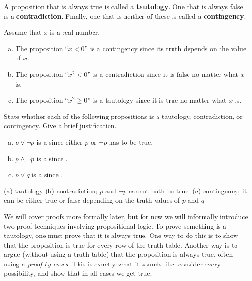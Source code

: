 \begin{df}
A proposition that is always true is called a {\bf tautology}.  
One that is always false is a {\bf contradiction}.  
Finally, one that is neither of these is called  a {\bf contingency}.
\end{df}

\begin{exa}
Assume that $x$ is a real number.
\begin{enumerate}[(a)]
\item
The proposition ``$x<0$'' is a contingency since its truth depends on the value of $x$.
\item
The proposition ``$x^2<0$'' is a contradiction since it is false no matter what $x$ is.
\item
The proposition ``$x^2\geq 0$'' is a tautology since it is true no matter what $x$ is.
\end{enumerate}
\end{exa}

\begin{fib}
State whether each of the following propositions is a tautology, contradiction, or contingency.
Give a brief justification.
\begin{enumerate}[(a)]
\item $p\vee\neg p$ is a  since either $p$ or $\neg p$ has to be true.
\item $p\wedge\neg p$ is a  since \blanklinefill.
\item $p\vee q$ is a  since \blanklinefill.
\end{enumerate}
\begin{answer}
(a) tautology (b) contradiction;  $p$ and $\neg p$ cannot both be true.
(c) contingency; it can be either true or false depending on the truth values of $p$ and $q$.
\end{answer}
\end{fib}

We will cover proofs more formally later, but for now we will
informally introduce two proof techniques involving propositional
logic. 
To prove something is a tautology, one must prove that it is always true.  One way to do this is
to show that the proposition is true for every row of the truth table.  Another way is to
argue (without using a truth table) that the proposition is always true, often using a {\em proof by cases}. 
This is exactly what it sounds like: 
consider every possibility, and show that in all cases we get true.

